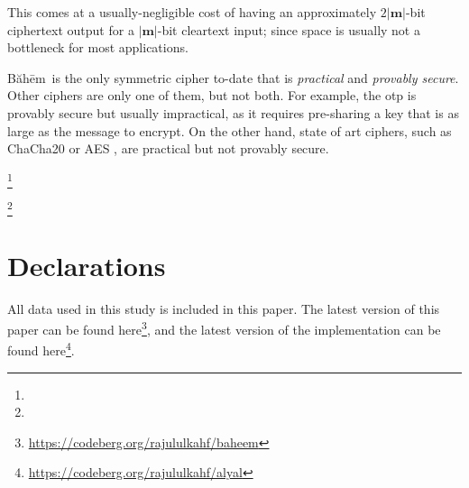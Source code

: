 \documentclass[twocolumn,hidelinks]{article}
\newcommand{\baheem}{Băhēm}
\newcommand\blfootnote[1]{%
  \begingroup
  \renewcommand\thefootnote{}\footnote{#1}%
  \addtocounter{footnote}{-1}%
  \endgroup
}
\begin{document}
This comes at a usually-negligible cost of having an approximately
$2|\mathbf{m}|$-bit ciphertext output for a $|\mathbf{m}|$-bit cleartext
input; since space is usually not a bottleneck for most applications. 

\baheem\ is the only symmetric cipher to-date that is \emph{practical} and
\emph{provably secure}.  Other ciphers are only one of them, but not both.
For example, the \gls{otp} is provably secure but usually impractical, as
it requires pre-sharing a key that is as large as the message to encrypt.
On the other hand, state of art ciphers, such as ChaCha20
or AES \cite{aes}, are practical but not provably secure.

\blfootnote{}
\blfootnote{\vspace{-1.5em}\doclicenseThis}
\vfill
\break

\section*{Declarations}
All data used in this study is included in this paper.  The latest version
of this paper can be found
here\footnote{\url{https://codeberg.org/rajululkahf/baheem}}, and the
latest version of the implementation can be found
here\footnote{\url{https://codeberg.org/rajululkahf/alyal}}.
\end{document}
